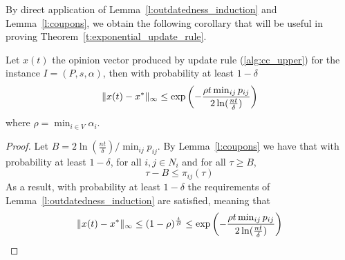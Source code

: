 By direct application of Lemma~\ref{l:outdatedness_induction} and 
Lemma~\ref{l:coupons}, we obtain the following corollary that 
will be useful in proving Theorem~\ref{t:exponential_update_rule}.
\begin{corollary}\label{cor:window}
Let $x(t)$ the opinion vector produced by update rule (\ref{alg:cc_upper})
for the instance $I=(P,s,\alpha)$, 
then with probability at least $1-\delta$
\[\norm{\infty}{x(t)-x^*} %
\leq \exp \lp(-\frac{\rho t\min_{ij}p_{ij}}{2\ln( \frac{nt}{\delta})} \rp)\]
where $\rho = \min_{i\in V}\alpha_i$.
\end{corollary}
\begin{proof}
Let $B=2\ln(\frac{nt}{\delta})/\min_{ij}p_{ij}$. By Lemma~\ref{l:coupons}
we have that with probability at least $1-\delta$, for all $i,j\in N_i$ and 
for all $\tau \geq B$, \[\tau -B \leq \pi_{ij}(\tau)  \]
As a result, with probability at least $1-\delta$ the requirements 
of Lemma~\ref{l:outdatedness_induction} are satisfied, meaning that 
\[\| x(t)-x^* \|_{\infty} \leq (1-\rho)^{\frac{t}{B}}
\leq \exp \left(-\frac{\rho t\min_{ij}p_{ij}}{2\ln( \frac{nt}{\delta})} \right)\]
\end{proof}



